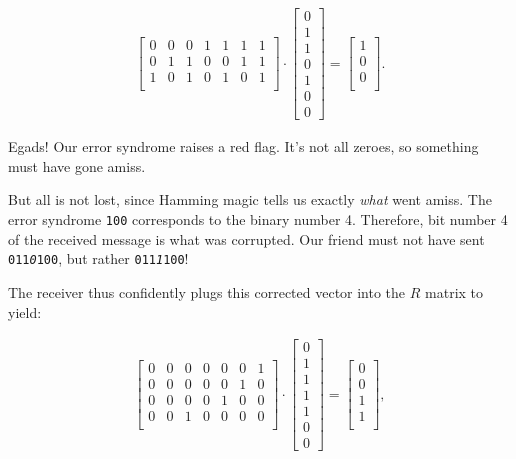 \vspace{-.15in}
\begin{align*}
\begin{bmatrix}
0 & 0 & 0 & 1 & 1 & 1 & 1 \\
0 & 1 & 1 & 0 & 0 & 1 & 1 \\
1 & 0 & 1 & 0 & 1 & 0 & 1 \\
\end{bmatrix} \cdot
\begin{bmatrix}
0 \\ 1 \\ 1 \\ 0 \\ 1 \\ 0 \\ 0
\end{bmatrix} =
\begin{bmatrix}
1 \\ 0 \\ 0 \\
\end{bmatrix}.
\end{align*}
\vspace{-.15in}

Egads! Our error syndrome raises a red flag. It's not all zeroes, so something
must have gone amiss.

But all is not lost, since Hamming magic tells us exactly \textit{what} went
amiss. The error syndrome \texttt{100} corresponds to the binary number 4.
Therefore, bit number 4 of the received message is what was corrupted. Our
friend must not have sent \texttt{011\textit{0}100}, but rather
\texttt{011\textit{1}100}!

The receiver thus confidently plugs this corrected vector into the $R$ matrix
to yield:

\vspace{-.15in}
\begin{align*}
\begin{bmatrix}
0 & 0 & 0 & 0 & 0 & 0 & 1 \\
0 & 0 & 0 & 0 & 0 & 1 & 0 \\
0 & 0 & 0 & 0 & 1 & 0 & 0 \\
0 & 0 & 1 & 0 & 0 & 0 & 0 \\
\end{bmatrix} \cdot
\begin{bmatrix}
0 \\ 1 \\ 1 \\ 1 \\ 1 \\ 0 \\ 0
\end{bmatrix} =
\begin{bmatrix}
0 \\ 0 \\ 1 \\ 1 \\
\end{bmatrix},
\end{align*}
\vspace{-.15in}

